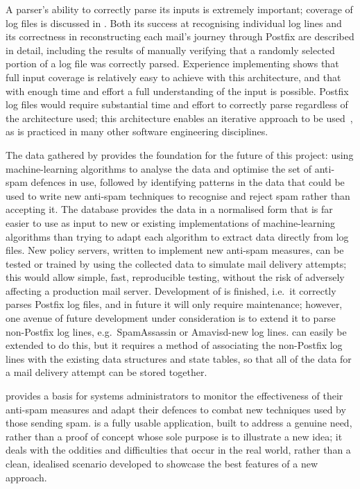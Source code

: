 A parser's ability to correctly parse its inputs is extremely important;
\parsernames{} coverage of \numberOFlogFILES{} log files is discussed in
.  Both its success at recognising individual
log lines  and its correctness in reconstructing each mail's journey
through Postfix are described in detail, including the results of manually
verifying that a randomly selected portion of a log file was correctly
parsed.  Experience implementing \parsername{} shows that full input
coverage is relatively easy to achieve with this architecture, and that
with enough time and effort a full understanding of the input is possible.
Postfix log files would require substantial time and effort to correctly
parse regardless of the architecture used; this architecture enables an
iterative approach to be used~\cite{stepwise-refinement}, as is practiced
in many other software engineering disciplines.

The data gathered by \parsername{} provides the foundation for the future
of this project: using machine-learning algorithms to analyse the data and
optimise the set of anti-spam defences in use, followed by identifying
patterns in the data that could be used to write new anti-spam techniques
to recognise and reject spam rather than accepting it.  The database
provides the data in a normalised form that is far easier to use as input
to new or existing implementations of machine-learning algorithms than
trying to adapt each algorithm to extract data directly from log files.
New policy servers, written to implement new anti-spam measures, can be
tested or trained by using the collected data to simulate mail delivery
attempts; this would allow simple, fast, reproducible testing, without the
risk of adversely affecting a production mail server.  Development of
\parsername{} is finished, i.e.\ it correctly parses Postfix log files, and
in future it will only require maintenance; however, one avenue of future
development under consideration is to extend it to parse non-Postfix log
lines, e.g.\ SpamAssassin or Amavisd-new log lines.  \parsername{} can
easily be extended to do this, but it requires a method of associating the
non-Postfix log lines with the existing data structures and state tables,
so that all of the data for a mail delivery attempt can be stored together.

\parsername{} provides a basis for systems administrators to monitor the
effectiveness of their anti-spam measures and adapt their defences to
combat new techniques used by those sending spam.  \parsername{} is a fully
usable application, built to address a genuine need, rather than a proof of
concept whose sole purpose is to illustrate a new idea; it deals with the
oddities and difficulties that occur in the real world, rather than a
clean, idealised scenario developed to showcase the best features of a new
approach.

